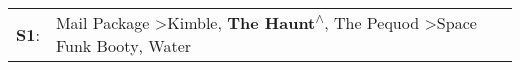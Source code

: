 \begin{supertabular}{p{0.03\textwidth}p{0.92\textwidth}}
 \textbf{S1}:  &  Mail Package\textsuperscript{} \textgreater \enspace Kimble\textsuperscript{}, \enspace \textbf{The Haunt\textsuperscript{$\wedge$}}, \enspace The Pequod\textsuperscript{} \textgreater \enspace Space Funk Booty\textsuperscript{}, \enspace Water\textsuperscript{}  \enspace  \\
\end{supertabular}
